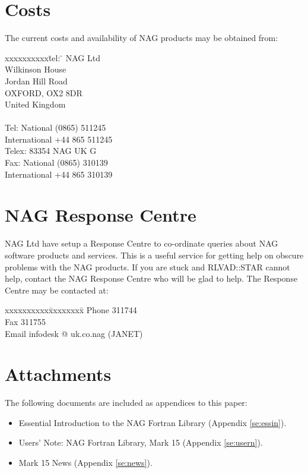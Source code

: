 \section{Costs}

The current costs and availability of NAG products may be obtained from:
\begin{tabbing}
xxxxxxxxxx\=tel: \=\kill
\>NAG Ltd\\
\>Wilkinson House\\
\>Jordan Hill Road\\
\>OXFORD, OX2 8DR\\
\>United Kingdom\\
\\
\>Tel: National (0865) 511245\\
\>\>International +44 865 511245\\
\>Telex: 83354 NAG UK G\\
\>Fax: National (0865) 310139\\
\>\>International +44 865 310139
\end{tabbing}

\section{NAG Response Centre}
\label{se:infodesk}

NAG Ltd have setup a Response Centre to co-ordinate queries about NAG software
products and services. This is a useful service for getting help on obscure
problems with the NAG products. If you are stuck and RLVAD::STAR cannot help,
contact the NAG Response Centre who will be glad to help. The Response Centre
may be contacted at:

\begin{tabbing}
xxxxxxxxxx\=xxxxxxxx\=\kill
\>Phone   311744 \\
\>Fax     311755 \\
\>Email  \>infodesk @ uk.co.nag   (JANET) \\
\end{tabbing}

\section{Attachments}

The following documents are included as appendices to this paper:
\begin{itemize}
\item Essential Introduction to the NAG Fortran Library (Appendix
\ref{se:essin}).
\item Users' Note: NAG Fortran Library, Mark 15 (Appendix \ref{se:usern}).
\item Mark 15 News (Appendix \ref{se:news}).
\end{itemize}

